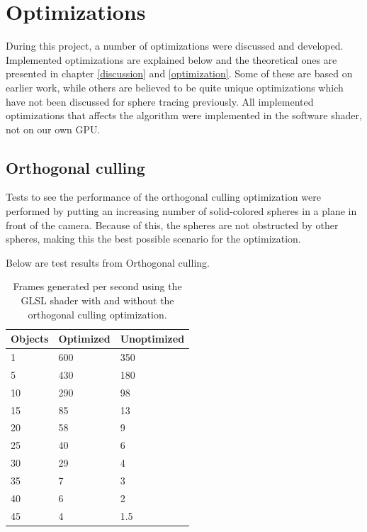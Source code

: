 	\section{Optimizations}
		
		During this project, a number of optimizations were discussed and
		developed. Implemented optimizations are explained below and the
		theoretical ones are presented in chapter \ref{discussion} and
		\ref{optimization}.  Some of these are based on earlier work, while
		others are believed to be quite unique optimizations which have not been
		discussed for sphere tracing previously. All implemented optimizations
		that affects the algorithm were implemented in the software shader, not
		on our own GPU.

		\subsection{Orthogonal culling}
		
		Tests to see the performance of the orthogonal culling optimization
		were performed by putting an increasing number of solid-colored spheres
		in a plane in front of the camera. Because of this, the spheres are not
		obstructed by other spheres, making this the best possible scenario for
		the optimization.

		Below are test results from Orthogonal culling.

			\begin{table}
			\centering
			\begin{tabular}{lll}
				\hline
				Objects & Optimized & Unoptimized \\ 
				\hline
				1       & 600       & 350         \\ 
				5       & 430       & 180         \\			
				10      & 290       & 98          \\
				15      & 85        & 13          \\
				20      & 58        & 9           \\
				25      & 40        & 6           \\
				30      & 29        & 4           \\
				35      & 7         & 3           \\
				40      & 6         & 2           \\
				45      & 4         & 1.5         \\
				\hline
			\end{tabular}
			\caption{Frames generated per second using the GLSL shader with and
				without the orthogonal culling optimization.}
			\end{table}

